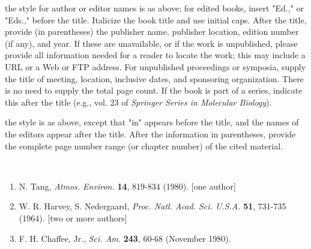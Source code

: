  the style for author or editor names is as above; for edited books, insert "Ed.," or "Eds.," before the title. Italicize the book title and use initial caps. After the title, provide (in parentheses) the publisher name, publisher location, edition number (if any), and year. If these are unavailable, or if the work is unpublished, please provide all information needed for a reader to locate the work; this may include a URL or a Web or FTP address. For unpublished proceedings or symposia, supply the title of meeting, location, inclusive dates, and sponsoring organization. There is no need to supply the total page count. If the book is part of a series, indicate this after the title (e.g., vol. 23 of {\em Springer Series in Molecular Biology}).

 the style is as above, except that "in" appears before the title, and the names of the editors appear after the title. After the information in parentheses, provide the complete page number range (or chapter number) of the cited material.

 \\
\begin{enumerate}
\item N. Tang, {\em Atmos. Environ.} {\bf 14}, 819-834 (1980). [one author]
\item W. R. Harvey, S. Nedergaard, {\em Proc. Natl. Acad. Sci. U.S.A.} {\bf 51}, 731-735 (1964). [two or more authors]
\item F. H. Chaffee, Jr., {\em Sci. Am.} {\bf 243}, 60-68 (November 1980).
\end{enumerate}

